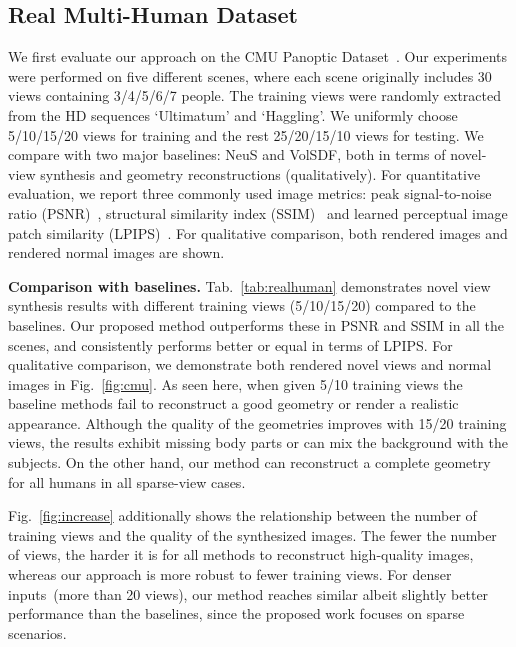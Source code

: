 \subsection{Real Multi-Human Dataset}
\label{sec:results_real}
We first evaluate our approach on the CMU Panoptic Dataset~\cite{Simon_2017_CVPR,Joo_2017_TPAMI}. %
Our experiments were performed on five different scenes, where each scene originally includes 30 views containing 3/4/5/6/7 people. The training views were randomly extracted from the HD sequences `Ultimatum' and `Haggling'.  We uniformly choose 5/10/15/20 views for training and the rest 25/20/15/10 views for testing. We compare with two major baselines: NeuS \cite{wang2021neus} and VolSDF\cite{yariv2021volume}, both in terms of novel-view synthesis and geometry reconstructions (qualitatively). For quantitative evaluation, we report three commonly used image metrics: peak signal-to-noise ratio (PSNR)~\cite{hore2010image}, structural similarity index (SSIM)~\cite{wang2004image} and learned perceptual image patch similarity (LPIPS)~\cite{zhang2018unreasonable}. For qualitative comparison, both rendered images and rendered normal images are shown. %

\noindent
\textbf{Comparison with baselines.} 
Tab.~\ref{tab:realhuman} demonstrates novel view synthesis results with different training views (5/10/15/20) compared to the baselines. Our proposed method outperforms these in PSNR and SSIM in all the scenes, and consistently performs better or equal in terms of LPIPS. For qualitative comparison, we demonstrate both rendered novel views and normal images in Fig.~\ref{fig:cmu}. As seen here, when given 5/10 training views the baseline methods fail to reconstruct a good geometry or render a realistic appearance. Although the quality of the geometries improves with 15/20 training views, the results exhibit missing body parts or can mix the background with the subjects. On the other hand, our method can reconstruct a complete geometry for all humans in all sparse-view cases.  

Fig.~\ref{fig:increase} additionally shows the relationship between the number of training views and the quality of the synthesized images. The fewer the number of views, the harder it is for all methods to reconstruct high-quality images, whereas our approach is more robust to fewer training views. For denser inputs~(\eg more than 20 views), our method reaches similar albeit slightly better performance than the baselines, since the proposed work focuses on sparse scenarios. 

